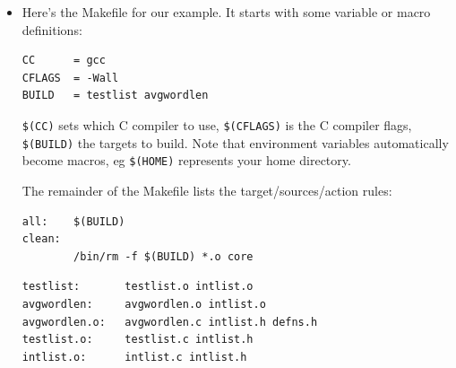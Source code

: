 \documentclass[aspectratio=169]{beamer}
\begin{document}
\begin{frame}[fragile]

\begin{itemize}
\item
    Here's the Makefile for our example.  It starts with some \alert{variable} or \alert{macro}
    definitions:
\small
\begin{verbatim}
CC      = gcc
CFLAGS  = -Wall
BUILD   = testlist avgwordlen
\end{verbatim}

\verb+$(CC)+ sets which C compiler to use,
\verb+$(CFLAGS)+ is the C compiler flags, \verb+$(BUILD)+ the targets to build.
Note that environment variables automatically become macros, eg \verb+$(HOME)+
represents your home directory.

\pitem
The remainder of the Makefile lists the target/sources/action rules:

\begin{verbatim}
all:    $(BUILD)
clean:
        /bin/rm -f $(BUILD) *.o core
\end{verbatim}

\pause
\begin{verbatim}
testlist:       testlist.o intlist.o
avgwordlen:     avgwordlen.o intlist.o
avgwordlen.o:   avgwordlen.c intlist.h defns.h
testlist.o:     testlist.c intlist.h
intlist.o:      intlist.c intlist.h
\end{verbatim}

\end{itemize}

\end{frame}
\end{document}
